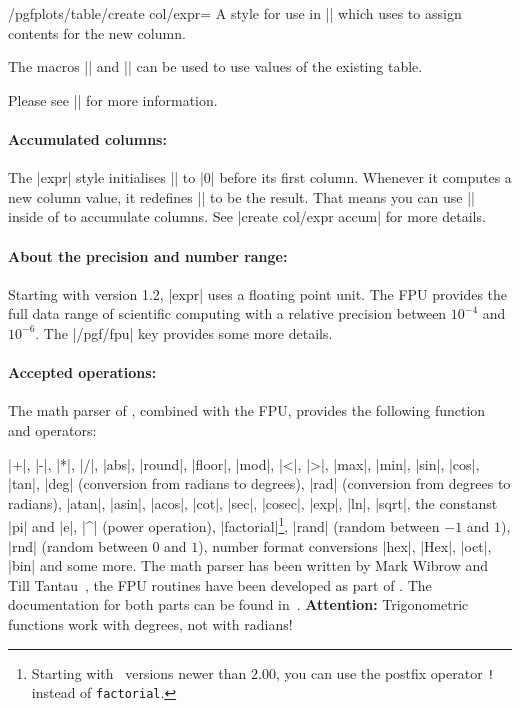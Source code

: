 \begin{stylekey}{/pgfplots/table/create col/expr=}
	A style for use in |\pgfplotstablecreatecol| which uses  to assign contents for the new column.

\begin{codeexample}[]

\end{codeexample}
	The macros |\thisrow| and |\nextrow| can be used to use values of the existing table.

	Please see |\pgfplotstablecreatecol| for more information.

	\paragraph{Accumulated columns:} The |expr| style initialises |\pgfmathaccuma| to |0| before its first column. Whenever it computes a new column value, it redefines |\pgfmathaccuma| to be the result. That means you can use |\pgfmathaccuma| inside of  to accumulate columns. See |create col/expr accum| for more details.

	\paragraph{About the precision and number range:} Starting with version 1.2, |expr| uses a floating point unit. The FPU provides the full data range of scientific computing with a relative precision between $10^{-4}$ and $10^{-6}$. The |/pgf/fpu| key provides some more details. 
	
	\paragraph{Accepted operations:} The math parser of \PGF, combined with the FPU, provides the following function and operators:

	|+|, |-|, |*|, |/|, |abs|, |round|, |floor|, |mod|, |<|, |>|, |max|, |min|, |sin|, |cos|, |tan|, |deg| (conversion from radians to degrees), |rad| (conversion from degrees to radians), |atan|, |asin|, |acos|, |cot|, |sec|, |cosec|, |exp|, |ln|, |sqrt|, the constanst |pi| and |e|, |^| (power operation), |factorial|\footnote{Starting with \PGF\ versions newer than $2.00$, you can use the postfix operator \texttt{!} instead of \texttt{factorial}.}, |rand| (random between $-1$ and $1$), |rnd| (random between $0$ and $1$), number format conversions |hex|, |Hex|, |oct|, |bin| and some more. The math parser has been written by Mark Wibrow and Till Tantau~\cite{tikz}, the FPU routines have been developed as part of \PGFPlots. The documentation for both parts can be found in~\cite{tikz}. \textbf{Attention:} Trigonometric functions work with degrees, not with radians!

\end{stylekey}

